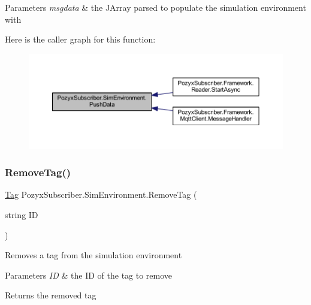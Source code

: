 \begin{DoxyParams}{Parameters}
{\em msgdata} & the J\+Array parsed to populate the simulation environment with\\
\hline
\end{DoxyParams}
Here is the caller graph for this function\+:
\nopagebreak
\begin{figure}[H]
\begin{center}
\leavevmode
\includegraphics[width=350pt]{class_pozyx_subscriber_1_1_sim_environment_abd4106d662f4991da45aa743b24c4d88_icgraph}
\end{center}
\end{figure}
\mbox{\label{class_pozyx_subscriber_1_1_sim_environment_a6386074fe09ea029c9203bd5cb969650}} 
\subsubsection{\texorpdfstring{Remove\+Tag()}{RemoveTag()}}
{\footnotesize\ttfamily \hyperlink{class_pozyx_subscriber_1_1_framework_1_1_tag}{Tag} Pozyx\+Subscriber.\+Sim\+Environment.\+Remove\+Tag (\begin{DoxyParamCaption}\item[{string}]{ID }\end{DoxyParamCaption})}



Removes a tag from the simulation environment 


\begin{DoxyParams}{Parameters}
{\em ID} & the ID of the tag to remove\\
\hline
\end{DoxyParams}
\begin{DoxyReturn}{Returns}
the removed tag 
\end{DoxyReturn}
\mbox{\label{class_pozyx_subscriber_1_1_sim_environment_a1804d91547ecc65c02091d63e8c1163e}} 
